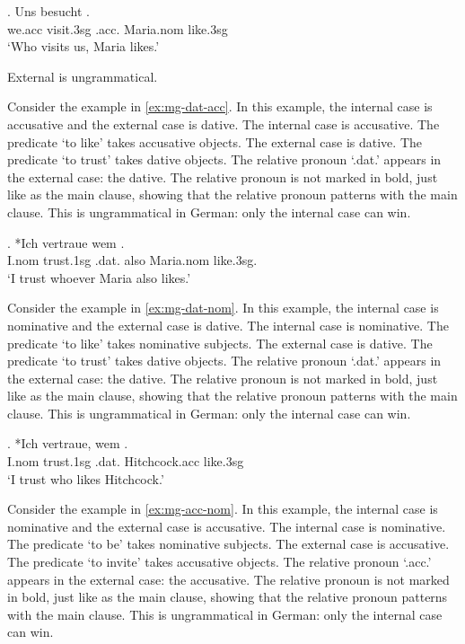 \exg. Uns besucht   .\\
 we.\ac{acc} visit.3\ac{sg}\scsub{[nom]} .\ac{acc}. Maria.\ac{nom} like.3\ac{sg}\scsub{[acc]}\\
 `Who visits us, Maria likes.' \label{ex:mg-nom-acc}

External is ungrammatical.

Consider the example in \ref{ex:mg-dat-acc}. In this example, the internal case is accusative and the external case is dative.
The internal case is accusative. The predicate  `to like' takes accusative objects.
The external case is dative. The predicate  `to trust' takes dative objects.
The relative pronoun  `.\ac{dat}.' appears in the external case: the dative. The relative pronoun is not marked in bold, just like as the main clause, showing that the relative pronoun patterns with the main clause.
This is ungrammatical in German: only the internal case can win.

\exg. *Ich vertraue wem   . \\
I.\ac{nom} trust.1\ac{sg}\scsub{[dat]} .\ac{dat}. also Maria.\ac{nom} like.3\ac{sg}\scsub{[acc]}.\\
`I trust whoever Maria also likes.' \label{ex:mg-dat-acc}

Consider the example in \ref{ex:mg-dat-nom}. In this example, the internal case is nominative and the external case is dative.
The internal case is nominative. The predicate  `to like' takes nominative subjects.
The external case is dative. The predicate  `to trust' takes dative objects.
The relative pronoun  `.\ac{dat}.' appears in the external case: the dative. The relative pronoun is not marked in bold, just like as the main clause, showing that the relative pronoun patterns with the main clause.
This is ungrammatical in German: only the internal case can win.

\exg. *Ich vertraue, wem  .\\
I.\ac{nom} trust.1\ac{sg}\scsub{[dat]} .\ac{dat}. Hitchcock.\ac{acc} like.3\ac{sg}\scsub{[nom]}\\
`I trust who likes Hitchcock.' \label{ex:mg-dat-nom}

Consider the example in \ref{ex:mg-acc-nom}. In this example, the internal case is nominative and the external case is accusative.
The internal case is nominative. The predicate  `to be' takes nominative subjects.
The external case is accusative. The predicate  `to invite' takes accusative objects.
The relative pronoun  `.\ac{acc}.' appears in the external case: the accusative. The relative pronoun is not marked in bold, just like as the main clause, showing that the relative pronoun patterns with the main clause.
This is ungrammatical in German: only the internal case can win.

